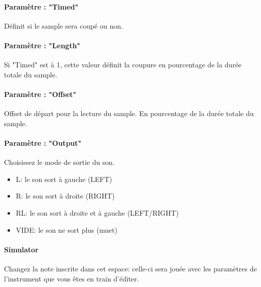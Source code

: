 \paragraph{Paramètre : "Timed"} Définit si le sample sera coupé ou non.

\paragraph{Paramètre : "Length"} Si "Timed" est à 1, cette valeur définit la coupure en pourcentage de la durée totale du sample.

\paragraph{Paramètre : "Offset"} Offset de départ pour la lecture du sample.
                                En pourcentage de la durée totale du sample.

\paragraph{Paramètre : "Output"} Choisissez le mode de sortie du son.
\medskip

\begin{itemize}
    \item{L: le son sort à gauche (LEFT)}
    \item{R: le son sort à droite (RIGHT)}
    \item{RL: le son sort à droite et à gauche (LEFT/RIGHT)}
    \item{VIDE: le son ne sort plus (muet)}
\end{itemize}

\paragraph{Simulator} Changez la note inscrite dans cet espace:
        celle-ci sera jouée avec les paramètres de l'instrument que vous êtes en train d'éditer.
